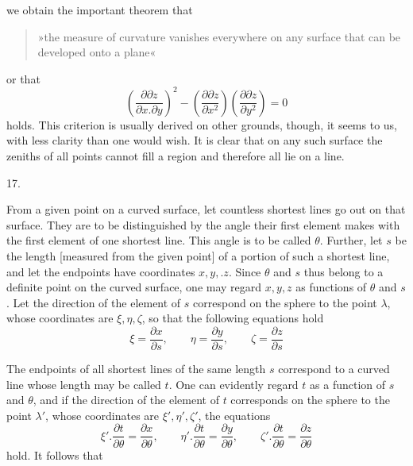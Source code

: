 %
we obtain the important theorem that
\begin{quote}
»the measure of curvature vanishes everywhere on any surface that can be developed onto a plane«
\end{quote}
\noindent or that
\[
\left(\frac{\partial\partial z}{\partial x.\partial y}\right)^{2}-\left(\frac{\partial\partial z}{\partial x^{2}}\right)\left(\frac{\partial\partial z}{\partial y^{2}}\right)=0
\]
holds. This criterion is usually derived on other grounds, though, it seems to us, with less clarity than one would wish. It is clear that on any such surface the zeniths of all points cannot fill a region and therefore all lie on a line.

\begin{center}17.\end{center}
\noindent\hspace*{1.2em}From a given point on a curved surface, let countless shortest lines go out on that surface. They are to be distinguished by the angle their first element makes with the first element of one  shortest line. This angle is to be called $\theta$. Further, let $s$ be the length [measured from the given point] of a portion of such a shortest line, and let the endpoints have coordinates $x,y,.z$. Since $\theta$ and $s$ thus belong to a definite point on the curved surface, one may regard $x,y,z$ as functions of $\theta$ and $s$. Let the direction of the element of $s$ correspond on the sphere to the point $\lambda$, whose coordinates are $\xi,\eta,\zeta$, so that the following equations hold
\[
\xi=\frac{\partial x}{\partial s},\qquad\eta=\frac{\partial y}{\partial s},\qquad\zeta=\frac{\partial z}{\partial s}
\]

The endpoints of all shortest lines of the same length $s$ correspond to a curved line whose length may be called $t$. One can evidently regard $t$ as a function of $s$ and $\theta$, and if the direction of the element of $t$ corresponds on the sphere to the point $\lambda'$, whose coordinates are $\xi',\eta',\zeta'$, the equations
\[
\xi'.\frac{\partial t}{\partial\theta}=\frac{\partial x}{\partial\theta},\qquad\eta'.\frac{\partial t}{\partial\theta}=\frac{\partial y}{\partial\theta},\qquad\zeta'.\frac{\partial t}{\partial\theta}=\frac{\partial z}{\partial\theta}
\]
hold. It follows that

